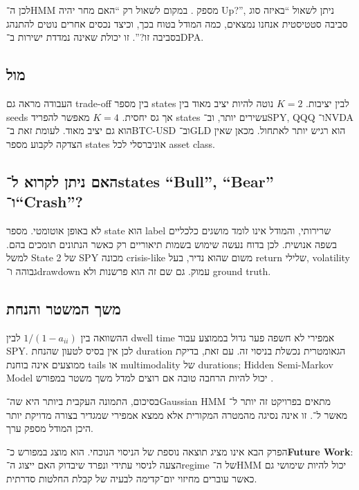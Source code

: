 לכן ה־HMM מספק \textbf{}. במקום לשאול רק ``האם מחר יהיה Up?'', ניתן לשאול ``באיזה סוג סביבה סטטיסטית אנחנו נמצאים, כמה המודל בטוח בכך, וכיצד נכסים אחרים נוטים להתנהג בסביבה זו?''. זו יכולת שאינה נמדדת ישירות ב־DPA.

\subsection{ מול }

העבודה מראה גם trade-off בין מספר states לבין יציבות. \(K=2\) נוטה להיות יציב מאוד בין seeds אך גס יחסית. \(K=4\) מאפשר להפריד states עשירים יותר, וב־SPY, QQQ ו־NVDA הוא גם יציב מאוד. לעומת זאת ב־BTC-USD וב־GLD הוא רגיש יותר לאתחול. מכאן שאין הצדקה לקבוע מספר states אוניברסלי לכל asset class.

\subsection{האם ניתן לקרוא ל־states ``Bull'', ``Bear'' ו־``Crash''?}

לא באופן אוטומטי. מספר state הוא label שרירותי, והמודל אינו לומד מושגים כלכליים בשפה אנושית. לכן בדוח נעשה שימוש בשמות תיאוריים רק כאשר הנתונים תומכים בהם. למשל State 2 של SPY מכונה crisis-like משום שהוא נדיר, בעל return שלילי, volatility גבוהה ו־drawdown עמוק. גם שם זה הוא פרשנות ולא ground truth.

\subsection{משך המשטר והנחת }

ההשוואה בין \(1/(1-a_{ii})\) לבין dwell time אמפירי לא חשפה פער גדול בממוצע עבור SPY. לכן אין בסיס לטעון שהנחת duration הגאומטרית נכשלת בניסוי זה. עם זאת, בדיקת ממוצעים אינה בוחנת tails או multimodality של durations; Hidden Semi-Markov Model יכול להיות הרחבה טובה אם רוצים למדל משך משטר במפורש \cite{bulla2006application}.

בסיכום, התמונה העקבית ביותר היא שה־Gaussian HMM מתאים בפרויקט זה יותר ל־\textbf{} מאשר ל־\textbf{}. זו אינה נסיגה מהמטרה המקורית אלא ממצא אמפירי שמגדיר בצורה מדויקת יותר היכן המודל מספק ערך.

הפרק הבא אינו מציג תוצאה נוספת של הניסוי הנוכחי. הוא מוצג במפורש כ־\textbf{Future Work}: הצעה לניסוי עתידי ונפרד שיבדוק האם ייצוג ה־regime של ה־HMM יכול להיות שימושי גם כאשר עוברים מחיזוי יום־קדימה לבעיה של קבלת החלטות סדרתית.
